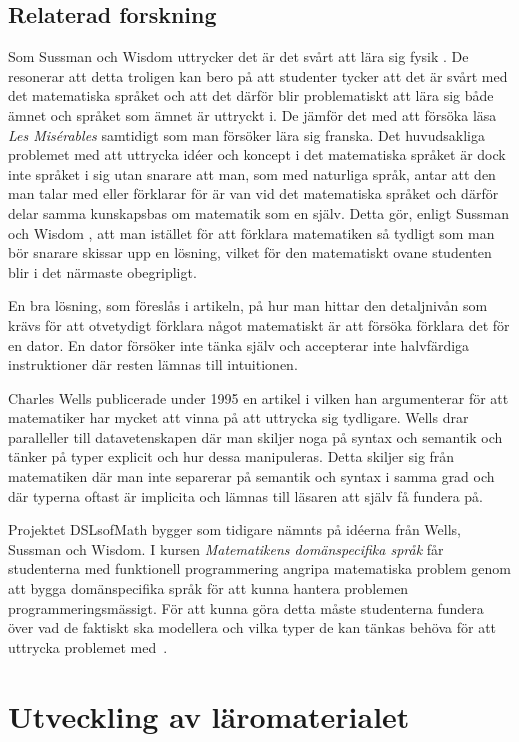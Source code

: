 \documentclass[]{article}
\begin{document}
\subsection{Relaterad forskning}
Som Sussman och Wisdom uttrycker det är det svårt att lära sig fysik
\cite{sussman2002role}. De resonerar att detta troligen kan bero på att
studenter tycker att det är svårt med det matematiska språket och att det
därför blir problematiskt att lära sig både ämnet och språket som ämnet är
uttryckt i. De jämför det med att försöka läsa \textit{Les Misérables}
samtidigt som man försöker lära sig franska. Det huvudsakliga problemet med att
uttrycka idéer och koncept i det matematiska språket är dock inte språket i sig
utan snarare att man, som med naturliga språk, antar att den man talar med
eller förklarar för är van vid det matematiska språket och därför delar
samma kunskapsbas om matematik som en själv. Detta gör, enligt Sussman och
Wisdom \cite{sussman2002role}, att man istället för att förklara matematiken
så tydligt som man bör snarare skissar upp en lösning, vilket för den
matematiskt ovane studenten blir i det närmaste obegripligt.

En bra lösning, som föreslås i artikeln, på hur man hittar den detaljnivån som
krävs för att otvetydigt förklara något matematiskt är att försöka förklara
det för en dator. En dator försöker inte tänka själv och accepterar inte
halvfärdiga instruktioner där resten lämnas till intuitionen.

Charles Wells publicerade under 1995 en artikel \cite{wells1995communicating}
i vilken han argumenterar för att matematiker har mycket att vinna på att
uttrycka  sig tydligare. Wells drar paralleller till datavetenskapen där man
skiljer noga på syntax och semantik och tänker på typer explicit och hur dessa
manipuleras. Detta skiljer sig från matematiken där man inte separerar på
semantik och syntax i samma grad och där typerna oftast är implicita och lämnas
till läsaren att själv få fundera på.

Projektet DSLsofMath bygger som tidigare nämnts på idéerna från Wells, Sussman
och Wisdom. I kursen \textit{Matematikens domänspecifika språk} får studenterna
med funktionell programmering angripa matematiska problem genom att bygga
domänspecifika språk för att kunna hantera problemen programmeringsmässigt.
För att kunna göra detta måste studenterna fundera över vad de faktiskt ska
modellera och vilka typer de kan tänkas behöva för att uttrycka problemet
med~\cite{kursplan:dslsofmath}.

\section{Utveckling av läromaterialet}
\label{sec:utveckling}
\end{document}
